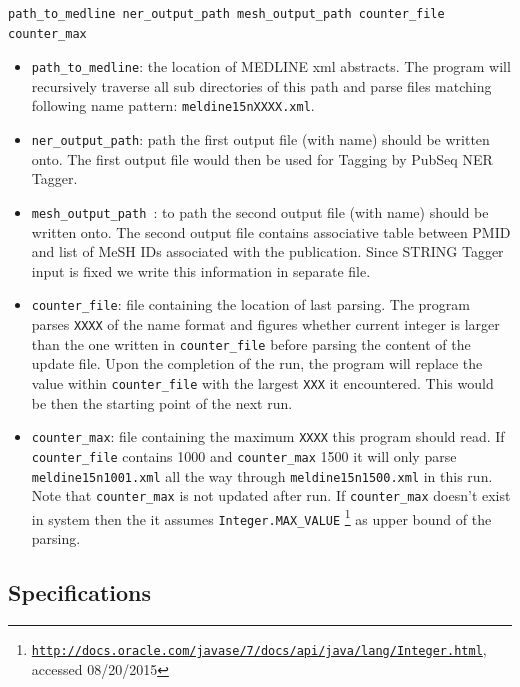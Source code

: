 \begin{lstlisting}[breaklines]
path_to_medline ner_output_path mesh_output_path counter_file counter_max
\end{lstlisting}

\begin{itemize}
\item \texttt{path\_to\_medline}: the location of MEDLINE xml abstracts. The program will recursively traverse all sub directories of this path and parse files matching following name pattern: \texttt{meldine15nXXXX.xml}.

\item \texttt{ner\_output\_path}: path the first output file (with name) should be written onto. The first output file would then be used for Tagging by PubSeq NER Tagger.

\item \texttt{mesh\_output\_path }: to path the second output file (with name) should be written onto. The second output file contains associative table between PMID and list of MeSH IDs associated with the publication. Since STRING Tagger input is fixed we write this information in separate file.

\item \texttt{counter\_file}: file containing the location of last parsing. The program parses \texttt{XXXX} of the name format and figures whether current integer is larger than the one written in \texttt{counter\_file} before parsing the content of the update file. Upon the completion of the run, the program will replace the value within \texttt{counter\_file} with the largest \texttt{XXX} it encountered. This would be then the starting point of the next run.

\item \texttt{counter\_max}: file containing the maximum \texttt{XXXX} this program should read. If \texttt{counter\_file} contains 1000 and \texttt{counter\_max} 1500 it will only parse \texttt{meldine15n1001.xml} all the way through \texttt{meldine15n1500.xml} in this run. Note that \texttt{counter\_max} is not updated after run. If \texttt{counter\_max} doesn't exist in system then the it assumes \texttt{Integer.MAX\_VALUE} \footnote{\href{http://docs.oracle.com/javase/7/docs/api/java/lang/Integer.html}{\texttt{http://docs.oracle.com/javase/7/docs/api/java/lang/Integer.html}}, accessed 08/20/2015} as upper bound of the parsing.
\end{itemize}

\subsection{Specifications}

